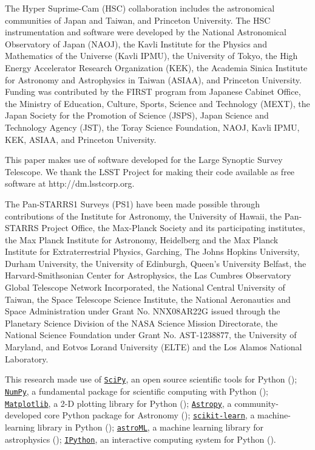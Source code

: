 \documentclass{pasj01}
\begin{document}
\begin{ack}

    The Hyper Suprime-Cam (HSC) collaboration includes the astronomical communities of 
    Japan and Taiwan, and Princeton University.  
    The HSC instrumentation and software were developed by the National Astronomical 
    Observatory of Japan (NAOJ), the Kavli Institute for the Physics and Mathematics of
    the Universe (Kavli IPMU), the University of Tokyo, the High Energy Accelerator 
    Research Organization (KEK), the Academia Sinica Institute for Astronomy and 
    Astrophysics in Taiwan (ASIAA), and Princeton University.
    Funding was contributed by the FIRST program from Japanese Cabinet Office, the 
    Ministry of Education, Culture, Sports, Science and Technology (MEXT), the Japan 
    Society for the Promotion of Science (JSPS), Japan Science and Technology Agency 
    (JST), the Toray Science  Foundation, NAOJ, Kavli IPMU, KEK, ASIAA, and Princeton 
    University.

    This paper makes use of software developed for the Large Synoptic Survey Telescope. 
    We thank the LSST Project for making their code available as free software at 
    http://dm.lsstcorp.org.

    The Pan-STARRS1 Surveys (PS1) have been made possible through contributions of the 
    Institute for Astronomy, the University of Hawaii, the Pan-STARRS Project Office, 
    the Max-Planck Society and its participating institutes, the Max Planck Institute 
    for Astronomy, Heidelberg and the Max Planck Institute for Extraterrestrial Physics, 
    Garching, The Johns Hopkins University, Durham University, the University of 
    Edinburgh, Queen's University Belfast, the Harvard-Smithsonian Center for Astrophysics, 
    the Las Cumbres Observatory Global Telescope Network Incorporated, the National 
    Central University of Taiwan, the Space Telescope Science Institute, the National 
    Aeronautics and Space Administration under Grant No. 
    NNX08AR22G issued through the Planetary Science Division of the NASA Science 
    Mission Directorate, the National Science Foundation under Grant No. AST-1238877, 
    the University of Maryland, and Eotvos Lorand University (ELTE) and the Los Alamos 
    National Laboratory.
   
    This research made use of
    \href{http://www.scipy.org/}{\texttt{SciPy}},
      an open source scientific tools for Python (\citealt{SciPy});
    \href{http://www.numpy.org/}{\texttt{NumPy}}, 
      a fundamental package for scientific computing with Python (\citealt{NumPy});
    \href{http://matplotlib.org/}{\texttt{Matplotlib}}, 
      a 2-D plotting library for Python (\citealt{Matplotlib});
    \href{http://www.astropy.org/}{\texttt{Astropy}}, a community-developed 
      core Python package for Astronomy (\citealt{AstroPy}); 
    \href{http://scikit-learn.org/stable/index.html}{\texttt{scikit-learn}},
      a machine-learning library in Python (\citealt{scikit-learn}); 
    \href{http://www.astroml.org/}{\texttt{astroML}}, 
      a machine learning library for astrophysics (\citealt{astroML});
    \href{https://ipython.org}{\texttt{IPython}}, 
      an interactive computing system for Python (\citealt{IPython}). 


\end{ack}
\end{document}
